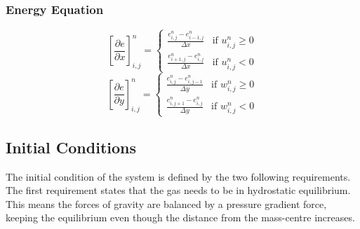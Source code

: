 \documentclass[10pt, nofootinbib, twocolumn]{revtex4-1}
\begin{document}
\subsubsection{Energy Equation}
\[\left[\frac{\partial e}{\partial x}\right]^{n}_{i,j} = 
\begin{cases}
\frac{e_{i,j}^{n}-e_{i-1,j}^{n}}{\Delta x} & \text{if } u_{i,j}^{n} \geq 0 \\
\frac{e_{i+1,j}^{n}-e_{i,j}^{n}}{\Delta x} & \text{if } u_{i,j}^{n} < 0
\end{cases}\]
\[\left[\frac{\partial e}{\partial y}\right]^{n}_{i,j} = 
\begin{cases}
\frac{e_{i,j}^{n}-e_{i,j-1}^{n}}{\Delta y} & \text{if } w_{i,j}^{n} \geq 0 \\
\frac{e_{i,j+1}^{n}-e_{i,j}^{n}}{\Delta y} & \text{if } w_{i,j}^{n} < 0
\end{cases}\]



\subsection{Initial Conditions}
The initial condition of the system is defined by the two following requirements. The first requirement states that the gas needs to be in hydrostatic equilibrium. This means the forces of gravity are balanced by a pressure gradient force, keeping the equilibrium even though the distance from the mass-centre increases. \\
\end{document}
